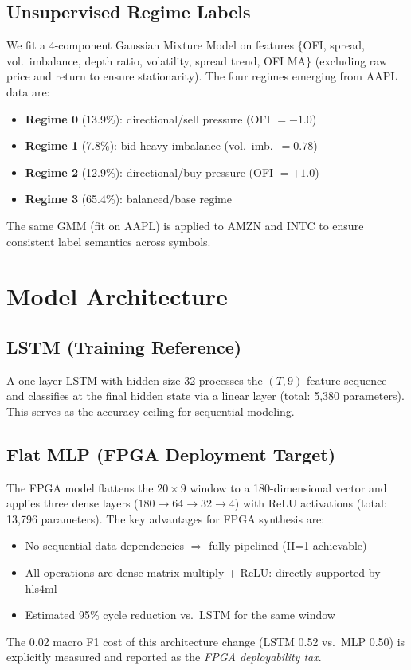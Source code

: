 \documentclass[conference]{IEEEtran}
\begin{document}
\subsection{Unsupervised Regime Labels}
We fit a 4-component Gaussian Mixture Model on features
$\{$OFI, spread, vol.\ imbalance, depth ratio, volatility, spread trend, OFI MA$\}$
(excluding raw price and return to ensure stationarity).
The four regimes emerging from AAPL data are:
\begin{itemize}
  \item \textbf{Regime 0} (13.9\%): directional/sell pressure (OFI $= -1.0$)
  \item \textbf{Regime 1} (7.8\%): bid-heavy imbalance (vol.\ imb.\ $= 0.78$)
  \item \textbf{Regime 2} (12.9\%): directional/buy pressure (OFI $= +1.0$)
  \item \textbf{Regime 3} (65.4\%): balanced/base regime
\end{itemize}
The same GMM (fit on AAPL) is applied to AMZN and INTC to ensure consistent
label semantics across symbols.


\section{Model Architecture}
\label{sec:model}

\subsection{LSTM (Training Reference)}
A one-layer LSTM with hidden size 32 processes the $(T, 9)$ feature sequence
and classifies at the final hidden state via a linear layer (total: 5,380 parameters).
This serves as the accuracy ceiling for sequential modeling.

\subsection{Flat MLP (FPGA Deployment Target)}
The FPGA model flattens the $20 \times 9$ window to a 180-dimensional vector
and applies three dense layers ($180 \to 64 \to 32 \to 4$) with ReLU activations
(total: 13,796 parameters). The key advantages for FPGA synthesis are:
\begin{itemize}
  \item No sequential data dependencies $\Rightarrow$ fully pipelined (II=1 achievable)
  \item All operations are dense matrix-multiply + ReLU: directly supported by hls4ml
  \item Estimated 95\% cycle reduction vs.\ LSTM for the same window
\end{itemize}
The 0.02 macro F1 cost of this architecture change (LSTM 0.52 vs.\ MLP 0.50) is
explicitly measured and reported as the \emph{FPGA deployability tax}.
\end{document}

